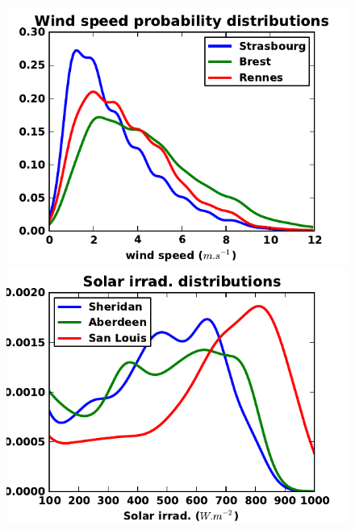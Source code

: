 \documentclass[xcolor=dvipsnames]{beamer}
\begin{document}
\begin{frame}
	\begin{figure}
		\includegraphics[scale=.3]{wind_distributions.pdf}
		\includegraphics[scale=.3]{solar_distributions.pdf}
	\end{figure}

\end{frame}
\end{document}
